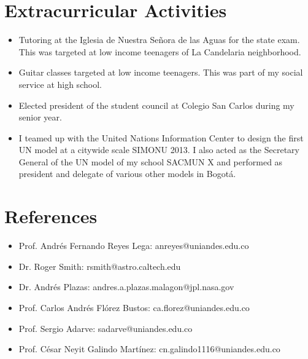 \documentclass[line,margin]{res}
\begin{document}
\begin{resume}
\section{Extracurricular Activities}

\begin{itemize}

\item Tutoring at the Iglesia de Nuestra Señora de las Aguas for the state exam. This was targeted at low income teenagers of La Candelaria neighborhood. 

\item Guitar classes targeted at low income teenagers. This was part of my social service at high school.

\item Elected president of the student council at Colegio San Carlos during my senior year.

\item I teamed up with the United Nations Information Center to design the first UN model at a citywide scale SIMONU 2013. I also acted as the Secretary General of the UN model of my school SACMUN X and performed as president and delegate of various other models in Bogotá.

\end{itemize}  
  
\section{References}  

\begin{itemize}

\item Prof. Andrés Fernando Reyes Lega: anreyes@uniandes.edu.co

\item Dr. Roger Smith: rsmith@astro.caltech.edu 

\item Dr. Andrés Plazas: andres.a.plazas.malagon@jpl.nasa.gov

\item Prof. Carlos Andrés Flórez Bustos: ca.florez@uniandes.edu.co

\item Prof. Sergio Adarve: sadarve@uniandes.edu.co

\item Prof. César Neyit Galindo Martínez: cn.galindo1116@uniandes.edu.co

\end{itemize}
  
\end{resume}
\end{document}
